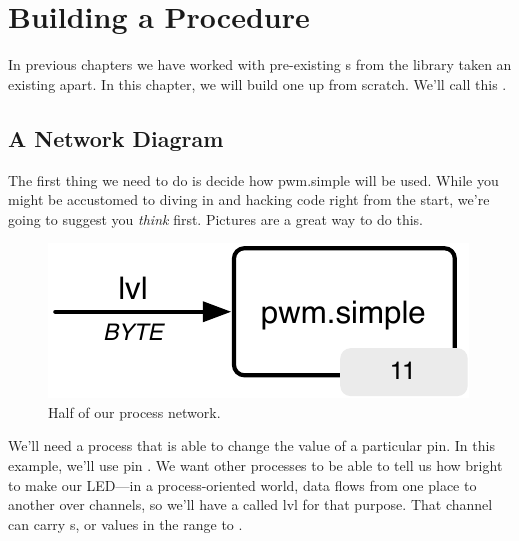 \newpage

\section{Building a Procedure}
In previous chapters we have worked with pre-existing {\PROCedure}s from the \plumbing library taken an existing \PROC apart. In this chapter, we will build one up from scratch. We'll call this .

\subsection{A Network Diagram}
The first thing we need to do is decide how {\code pwm.simple} will be used. While you might be accustomed to diving in and hacking code right from the start, we're going to suggest you {\em think} first. Pictures are a great way to do this.

\vspace{3mm}
\begin{figure}[ht]
  \begin{center}
    \includegraphics[width=0.8\linewidth]{images/ch7-half-network}
    \caption{Half of our process network.}
    \label{image:ch7-half-network}
  \end{center}
\end{figure}

We'll need a process that is able to change the value of a particular pin. In this example, we'll use pin \pineleven. We want other processes to be able to tell us how bright to make our LED---in a process-oriented world, data flows from one place to another over channels, so we'll have a \CHAN called {\code lvl} for that purpose. That channel can carry {\BYTE}s, or values in the range {} to {}.

